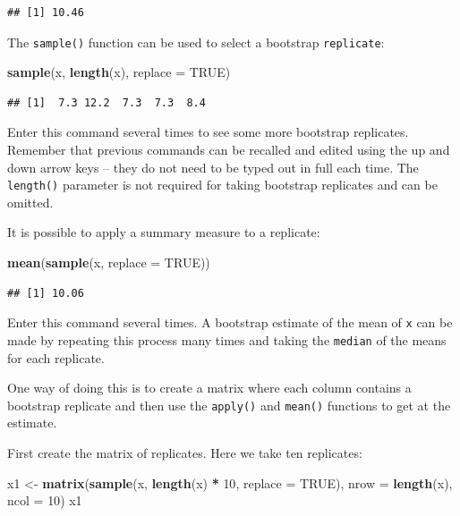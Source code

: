 \documentclass[12pt,a4paper]{book}
\newenvironment{Shaded}{\begin{snugshade}}{\end{snugshade}}
\newcommand{\KeywordTok}[1]{\textcolor[rgb]{0.13,0.29,0.53}{\textbf{#1}}}
\newcommand{\DataTypeTok}[1]{\textcolor[rgb]{0.13,0.29,0.53}{#1}}
\newcommand{\DecValTok}[1]{\textcolor[rgb]{0.00,0.00,0.81}{#1}}
\newcommand{\StringTok}[1]{\textcolor[rgb]{0.31,0.60,0.02}{#1}}
\newcommand{\OtherTok}[1]{\textcolor[rgb]{0.56,0.35,0.01}{#1}}
\newcommand{\OperatorTok}[1]{\textcolor[rgb]{0.81,0.36,0.00}{\textbf{#1}}}
\newcommand{\NormalTok}[1]{#1}
\theoremstyle{definition}
\theoremstyle{definition}
\theoremstyle{definition}
\theoremstyle{remark}
\begin{document}
\begin{verbatim}
## [1] 10.46
\end{verbatim}

The \texttt{sample()} function can be used to select a bootstrap
\texttt{replicate}:

\begin{Shaded}
\begin{Highlighting}[]
\KeywordTok{sample}\NormalTok{(x, }\KeywordTok{length}\NormalTok{(x), }\DataTypeTok{replace =} \OtherTok{TRUE}\NormalTok{)}
\end{Highlighting}
\end{Shaded}

\begin{verbatim}
## [1]  7.3 12.2  7.3  7.3  8.4
\end{verbatim}

Enter this command several times to see some more bootstrap replicates.
Remember that previous commands can be recalled and edited using the up
and down arrow keys -- they do not need to be typed out in full each
time. The \texttt{length()} parameter is not required for taking
bootstrap replicates and can be omitted.

It is possible to apply a summary measure to a replicate:

\begin{Shaded}
\begin{Highlighting}[]
\KeywordTok{mean}\NormalTok{(}\KeywordTok{sample}\NormalTok{(x, }\DataTypeTok{replace =} \OtherTok{TRUE}\NormalTok{))}
\end{Highlighting}
\end{Shaded}

\begin{verbatim}
## [1] 10.06
\end{verbatim}

Enter this command several times. A bootstrap estimate of the mean of
\texttt{x} can be made by repeating this process many times and taking
the \texttt{median} of the means for each replicate.

One way of doing this is to create a matrix where each column contains a
bootstrap replicate and then use the \texttt{apply()} and
\texttt{mean()} functions to get at the estimate.

First create the matrix of replicates. Here we take ten replicates:

\begin{Shaded}
\begin{Highlighting}[]
\NormalTok{x1 <-}\StringTok{ }\KeywordTok{matrix}\NormalTok{(}\KeywordTok{sample}\NormalTok{(x, }\KeywordTok{length}\NormalTok{(x) }\OperatorTok{*}\StringTok{ }\DecValTok{10}\NormalTok{, }\DataTypeTok{replace =} \OtherTok{TRUE}\NormalTok{),}
             \DataTypeTok{nrow =} \KeywordTok{length}\NormalTok{(x), }\DataTypeTok{ncol =} \DecValTok{10}\NormalTok{)}
\NormalTok{x1}
\end{Highlighting}
\end{Shaded}
\end{document}

